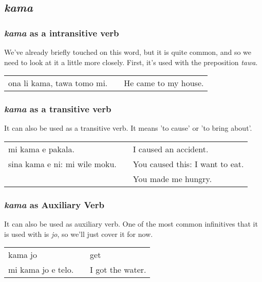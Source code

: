 \subsection*{\textit{kama}}
\subsubsection*{\textit{kama} as a intransitive verb}
%
We've already briefly touched on this word, but it is quite common, and so we need to look at it a little more closely. 
First, it's used with the preposition \textit{tawa}.

\begin{supertabular}{p{5,5cm}|ll}
ona li kama, tawa tomo mi. && He came to my house. \\
\end{supertabular} 
%
\subsubsection*{\textit{kama} as a transitive verb}
%
It can also be used as a transitive verb. 
It means 'to cause' or 'to bring about'.

\begin{supertabular}{p{5,5cm}|ll}
mi kama e pakala. && I caused an accident. \\
sina kama e ni: mi wile moku. && You caused this: I want to eat. \\ && You made me hungry. \\
\end{supertabular} 
%
\subsubsection*{\textit{kama} as Auxiliary Verb}
%
It can also be used as auxiliary verb. 
One of the most common infinitives that it is used with is \textit{jo}, so we'll just cover it for now. 

\begin{supertabular}{p{5,5cm}|ll}
kama jo && get \\
mi kama jo e telo. && I got the water. \\
\end{supertabular} 
%
\newpage
